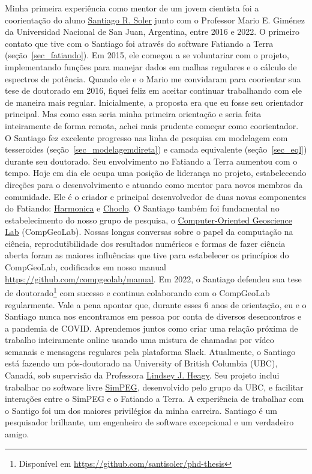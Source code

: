 \documentclass[10pt,a4paper,oneside]{book}
\newcommand{\SantiagoLink}{\href{https://www.santisoler.com/}{Santiago R. Soler}}
\begin{document}
Minha primeira experiência como mentor de um jovem cientista foi a coorientação
do aluno \SantiagoLink{} junto com o
Professor Mario E. Giménez da Universidad Nacional de San Juan, Argentina,
entre 2016 e 2022.
O primeiro contato que tive com o Santiago foi através do software
Fatiando a Terra (seção~\ref{sec_fatiando}).
Em 2015, ele começou a se voluntariar com o projeto, implementando funções
para manejar dados em malhas regulares e o cálculo de espectros de potência.
Quando ele e o Mario me convidaram para coorientar sua tese de doutorado em
2016, fiquei feliz em aceitar continuar trabalhando com ele de maneira mais
regular.
Inicialmente, a proposta era que eu fosse seu orientador principal.
Mas como essa seria minha primeira orientação e seria feita inteiramente de
forma remota, achei mais prudente começar como coorientador.
O Santiago fez excelente progresso nas linha de pesquisa em modelagem com
tesseroides (seção~\ref{sec_modelagemdireta}) e camada equivalente
(seção~\ref{sec_eql}) durante seu doutorado.
Seu envolvimento no Fatiando a Terra aumentou com o tempo. Hoje em dia ele
ocupa uma posição de liderança no projeto, estabelecendo direções para o
desenvolvimento e atuando como mentor para novos membros da comunidade.
Ele é o criador e principal desenvolvedor de duas novas componentes do
Fatiando: \href{https://www.fatiando.org/harmonica}{Harmonica} e
\href{https://www.fatiando.org/choclo/}{Choclo}.
O Santiago também foi fundamental no estabelecimento do nosso grupo de pesquisa,
o \href{https://www.compgeolab.org/}{Computer-Oriented Geoscience Lab}
(CompGeoLab).
Nossas longas conversas sobre o papel da computação na ciência,
reprodutibilidade dos resultados numéricos e formas de fazer ciência aberta
foram as maiores influências que tive para estabelecer os princípios do
CompGeoLab, codificados em nosso manual
\url{https://github.com/compgeolab/manual}.
Em 2022, o Santiago defendeu sua tese de doutorado\footnote{Disponível em
\url{https://github.com/santisoler/phd-thesis}} com sucesso e continua
colaborando com o CompGeoLab regularmente.
Vale a pena apontar que, durante esses 6 anos de orientação, eu e o Santiago
nunca nos encontramos em pessoa por conta de diversos desencontros e a pandemia
de COVID.
Aprendemos juntos como criar uma relação próxima de trabalho inteiramente
online usando uma mistura de chamadas por vídeo semanais e mensagens regulares
pela plataforma Slack.
Atualmente, o Santiago está fazendo um pós-doutorado na University of British
Columbia (UBC), Canadá, sob supervisão da Professora
\href{https://lindseyjh.ca/}{Lindsey J. Heagy}.
Seu projeto inclui trabalhar no software livre
\href{https://simpeg.xyz/}{SimPEG}, desenvolvido pelo grupo da UBC, e facilitar
interações entre o SimPEG e o Fatiando a Terra.
A experiência de trabalhar com o Santigo foi um dos maiores privilégios da
minha carreira.
Santiago é um pesquisador brilhante, um engenheiro de software excepcional
e um verdadeiro amigo.
\end{document}

